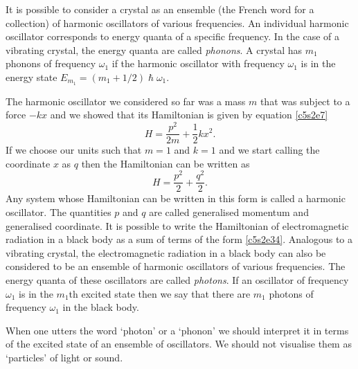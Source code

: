 It is possible to consider a crystal as an ensemble (the French word for a 
collection) of harmonic oscillators of various frequencies. An individual
harmonic oscillator corresponds to energy quanta of a specific frequency. In
the case of a vibrating crystal, the energy quanta are called \emph{phonons}.
A crystal has $m_1$ phonons of frequency $\omega_1$ if the harmonic oscillator
with frequency $\omega_1$ is in the energy state $E_{m_1} = (m_1 + 1/2)\hslash
\omega_1$.

The harmonic oscillator we considered so far was a mass $m$ that was subject to
a force $-kx$ and we showed that its Hamiltonian is given by equation 
\eqref{c5s2e7}
\[
H = \frac{p^2}{2m} + \frac{1}{2}kx^2.
\]
If we choose our units such that $m = 1$ and $k = 1$ and we start calling the 
coordinate $x$ as $q$ then the Hamiltonian can be written as
\begin{equation}\label{c5s2e34}
H = \frac{p^2}{2} + \frac{q^2}{2}.
\end{equation}
Any system whose Hamiltonian can be written in this form is called a harmonic
oscillator. The quantities $p$ and $q$ are called generalised momentum and 
generalised coordinate. It is possible to write the Hamiltonian of 
electromagnetic radiation in a black body as a sum of terms of the form 
\eqref{c5s2e34}. Analogous to a vibrating crystal, the electromagnetic radiation
in a black body can also be considered to be an ensemble of harmonic oscillators
of various frequencies. The energy quanta of these oscillators are called
\emph{photons}. If an oscillator of frequency $\omega_1$ is in the $m_1$th
excited state then we say that there are $m_1$ photons of frequency $\omega_1$
in the black body. 

When one utters the word  `photon' or a `phonon' we should interpret it in terms
of the excited state of an ensemble of oscillators. We should not visualise them 
as `particles' of light or sound.